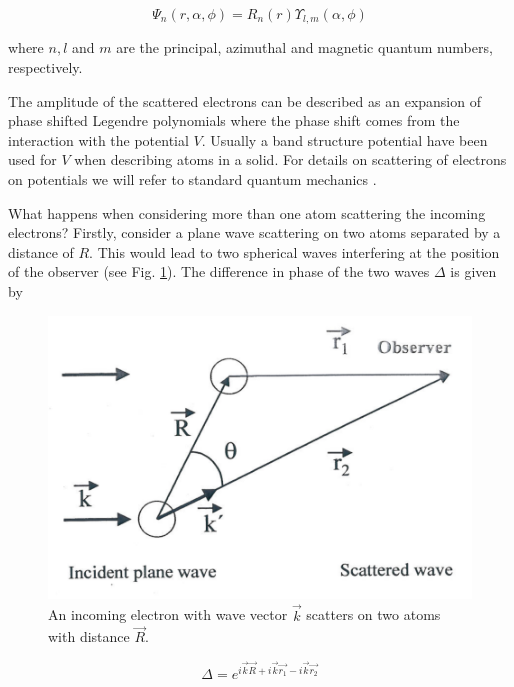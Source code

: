 \begin{equation}
\Psi_n(r,\alpha,\phi)=R_n(r)\Upsilon_{l,m}(\alpha,\phi) 
\end{equation}

\noindent where $n, l$ and $m$ are the principal, azimuthal and magnetic quantum numbers, respectively.

The amplitude of the scattered electrons can  be described as an expansion of phase shifted Legendre polynomials where the phase shift comes from the interaction with the potential $V$. Usually a band structure potential have been used for $V$ when describing atoms in a solid. For details on scattering of electrons on potentials we will refer to standard quantum mechanics \cite{Shiff,Merzbacher}.

What happens when considering more than one  atom scattering the incoming electrons? Firstly, consider a plane wave scattering on two atoms separated by a distance of $R$. This would lead to two spherical waves interfering at the position of the observer (see Fig. \ref{fig:electronscatter}). The difference in phase of the two waves $\Delta$ is given by

\begin{figure}[h!]
	\begin{center}
	\includegraphics[scale=2]{figures/09_08.png}
	\caption{An incoming electron with wave vector $\vec{k}$ scatters on two atoms with distance $\vec{R}$.}
	\label{fig:electronscatter}
	\end{center}
\end{figure}

\begin{equation}
\Delta=e^{i\vec{k} \vec{R}+i\vec{k} \vec{r_1}-i\vec{k}\vec{r_2}} 
\end{equation}

